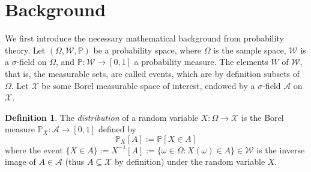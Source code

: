 \documentclass[twoside]{article} \usepackage{aistats2017}
\theoremstyle{definition}
\newtheorem{definition}{Definition}[section]
\theoremstyle{theorem}
\newcommand{\rv}[1]{{#1}}
\begin{document}
% 
% 
	
\section{Background}
\label{sec:background}
	
%
%
	We first introduce the necessary mathematical background from probability theory. Let $(\Omega, \mathcal{W}, \mathbb{P})$ be a probability space, where $\Omega$ is the sample space, $\mathcal{W}$ is a $\sigma$-field on $\Omega$, and $\mathbb{P} : \mathcal{W} \to [0, 1]$ a probability measure. The elements $W$ of $\mathcal{W}$, that is, the measurable sets, are called events, which are by definition subsets of $\Omega$. Let $\mathcal{X}$ be some Borel measurable space of interest, endowed by a $\sigma$-field $\mathcal{A}$ on $\mathcal{X}$.
%
%
	
	\begin{definition} \label{def:distribution}
		\citep{bauer1981probability}
		The \textit{distribution} of a random variable $\rv{X} : \Omega \to \mathcal{X}$ is the Borel measure $\mathbb{P}_{\rv{X}} : \mathcal{A} \to [0, 1]$ defined by
		\begin{equation}
			\mathbb{P}_{\rv{X}}[A] := \mathbb{P}[\rv{X} \in A]
		\label{eq:distribution}
		\end{equation}
		where the event $\{\rv{X} \in A\} := \rv{X}^{-1}[A] := \{\omega \in \Omega : \rv{X}(\omega) \in A\} \in \mathcal{W}$ is the inverse image of $A \in \mathcal{A}$ (thus $A \subseteq \mathcal{X}$ by definition) under the random variable $\rv{X}$.
	\end{definition}
	
\end{document}
